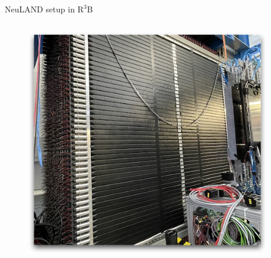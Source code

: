 \documentclass[compress, 13pt, aspectratio=169]{beamer}
\begin{document}
{
\begin{frame}{NeuLAND setup in $\text{R}^3\text{B}$}
	\begin{columns}[c]
		\begin{column}{0.4\textwidth}
			\pause
			\begin{figure}
				\includegraphics[width = \textwidth]{neulandReal}
			\end{figure}
		\end{column}
		\hspace*{0.5cm}
		\begin{column}{0.3\textwidth}
			\begin{exampleblock}{}

\end{exampleblock}
\end{column}
\end{columns}
\end{frame}}
\end{document}
